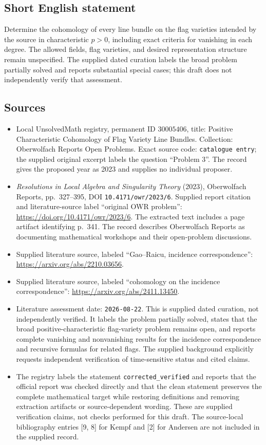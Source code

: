 \documentclass[11pt]{article}
\begin{document}
\subsection{Short English statement}
Determine the cohomology of every line bundle on the flag varieties intended by the source in characteristic \(p>0\), including exact criteria for vanishing in each degree. The allowed fields, flag varieties, and desired representation structure remain unspecified. The supplied dated curation labels the broad problem partially solved and reports substantial special cases; this draft does not independently verify that assessment.
\subsection{Sources}
\begin{itemize}
\item Local UnsolvedMath registry, permanent ID \(30005406\), title: Positive Characteristic Cohomology of Flag Variety Line Bundles. Collection: Oberwolfach Reports Open Problems. Exact source code: \texttt{catalogue entry}; the supplied original excerpt labels the question ``Problem 3''. The record gives the proposed year as 2023 and supplies no individual proposer.
\item \emph{Resolutions in Local Algebra and Singularity Theory} (2023), Oberwolfach Reports, pp.\ 327--395, DOI \texttt{10.4171/owr/2023/6}. Supplied report citation and literature-source label ``original OWR problem'': \url{https://doi.org/10.4171/owr/2023/6}. The extracted text includes a page artifact identifying p.\ 341. The record describes Oberwolfach Reports as documenting mathematical workshops and their open-problem discussions.
\item Supplied literature source, labeled ``Gao--Raicu, incidence correspondence'': \url{https://arxiv.org/abs/2210.03656}.
\item Supplied literature source, labeled ``cohomology on the incidence correspondence'': \url{https://arxiv.org/abs/2411.13450}.
\item Literature assessment date: \texttt{2026-08-22}. This is supplied dated curation, not independently verified. It labels the problem partially solved, states that the broad positive-characteristic flag-variety problem remains open, and reports complete vanishing and nonvanishing results for the incidence correspondence and recursive formulas for related flags. The supplied background explicitly requests independent verification of time-sensitive status and cited claims.
\item The registry labels the statement \texttt{corrected\_verified} and reports that the official report was checked directly and that the clean statement preserves the complete mathematical target while restoring definitions and removing extraction artifacts or source-dependent wording. These are supplied verification claims, not checks performed for this draft. The source-local bibliography entries [9, 8] for Kempf and [2] for Andersen are not included in the supplied record.
\end{itemize}
\end{document}
